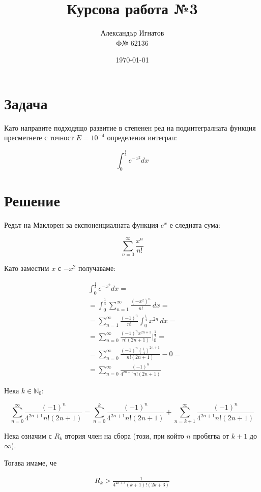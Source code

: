 \documentclass{article}
\title{Курсова работа №3}
\author{Александър Игнатов \\ Ф№ 62136 }
\date{\today}
\begin{document}
\maketitle

\section*{Задача}

Като направите подходящо развитие в степенен ред на подинтегралната функция пресметнете с точност \( E = 10^{-4} \) определения интеграл:

\[
    \int_0^\frac{1}{4}e^{-x^2}dx
\]

\section*{Решение}

Редът на Маклорен за експоненциалната функция \( e^x \) е следната сума:

\[
    \sum_{n=0}^{\infty} \frac{x^n}{n!}
\]

Като заместим \( x \) с \( -x^2 \) получаваме:

\begin{align*}
    & \int_0^\frac{1}{4}e^{-x^2}dx = \\
    &= \int_{0}^{\frac{1}{4}} \sum_{n=1}^{\infty} \frac{(-x^2)^{n}}{n!} \, dx = \\
    &= \sum_{n=1}^{\infty} \frac{(-1)^n}{n!} \int_{0}^{\frac{1}{4}} x^{2n} \, dx = \\
    &= \sum_{n=0}^{\infty} \frac{(-1)^nx^{2n+1}}{n!(2n+1)}\biggr\rvert_0^\frac{1}{4} = \\
    &= \sum_{n=0}^{\infty} \frac{(-1)^n \left(\frac{1}{4}\right)^{2n+1}}{n!(2n+1)} - 0 = \\
    &= \sum_{n=0}^{\infty} \frac{(-1)^n}{4^{2n+1}n!(2n+1)}
\end{align*}

Нека \( k \in \mathbb{N}_0 \):

\[
    \sum_{n=0}^{\infty} \frac{(-1)^n}{4^{2n+1}n!(2n+1)} = \sum_{n=0}^{k} \frac{(-1)^n}{4^{2n+1}n!(2n+1)} + \sum_{n=k+1}^{\infty} \frac{(-1)^n}{4^{2n+1}n!(2n+1)}
\]

Нека означим с \( R_k \) втория член на сбора (този, при който \( n \) пробягва от \( k + 1\) до \( \infty \)).

Тогава имаме, че

\begin{gather}
    R_k > \frac{1}{4^{2k+3}(k+1)!(2k+3)}
\end{gather}
\end{document}
